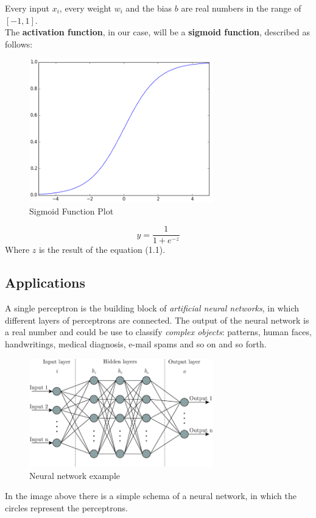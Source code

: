 Every input $x_{i}$, every weight $w_{i}$ and the bias $b$ are real numbers in the range of $[-1, 1]$. \\
The \textbf{activation function}, in our case, will be a \textbf{sigmoid function}, described as follows:
\begin{figure}[h]
	\centering
	\caption{Sigmoid Function Plot}
	\includegraphics[width=8cm]{img/sigmoid.png}
\end{figure}
\begin{equation}
	y = \dfrac{1}{1+e^{-z}}
\end{equation}
Where $z$ is the result of the equation (1.1).
\subsection{Applications}
A single perceptron is the building block of \textit{artificial neural networks}, in which different layers of perceptrons are connected. The output of the neural network is a real number and could be use to classify \textit{complex objects}: patterns, human faces, handwritings, medical diagnosis, e-mail spams and so on and so forth.\\
\begin{figure}[H]
	\centering
	\caption{Neural network example}
	\includegraphics[width=8cm]{img/neural_network.png}
\end{figure}
In the image above there is a simple schema of a neural network, in which the circles represent the perceptrons.
